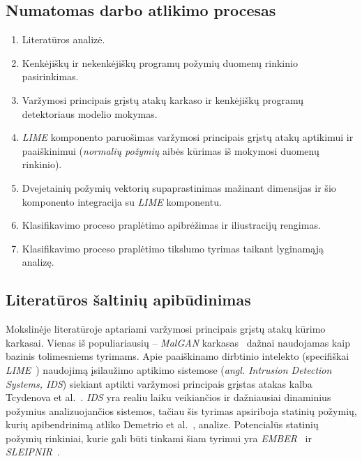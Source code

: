 \subsection{Numatomas darbo atlikimo procesas}

\begin{enumerate}
    \item Literatūros analizė.
    \item Kenkėjiškų ir nekenkėjiškų programų požymių duomenų rinkinio pasirinkimas.
    \item Varžymosi principais grįstų atakų karkaso ir kenkėjiškų programų detektoriaus
          modelio mokymas.
    \item \textit{LIME} komponento paruošimas varžymosi principais grįstų atakų aptikimui ir paaiškinimui (\textit{normalių požymių} aibės kūrimas iš mokymosi duomenų rinkinio).
    \item Dvejetainių požymių vektorių supaprastinimas mažinant dimensijas ir šio
          komponento integracija su \textit{LIME} komponentu.
    \item Klasifikavimo proceso praplėtimo apibrėžimas ir iliustracijų rengimas.
    \item Klasifikavimo proceso praplėtimo tikslumo tyrimas taikant lyginamąją analizę.
\end{enumerate}

\subsection{Literatūros šaltinių apibūdinimas}

Mokslinėje literatūroje aptariami varžymosi principais grįstų atakų kūrimo
karkasai. Vienas iš populiariausių -- \textit{MalGAN}
karkasas~\cite{huGeneratingAdversarialMalware2017} dažnai naudojamas kaip
bazinis tolimesniems tyrimams. Apie paaiškinamo dirbtinio intelekto
(specifiškai \textit{LIME}~\cite{ribeiroWhyShouldTrust2016}) naudojimą įsilaužimo aptikimo sistemose
(\textit{angl. Intrusion Detection Systems, IDS}) siekiant aptikti varžymosi
principais grįstas atakas kalba Tcydenova et
al.~\cite{tcydenovaDetectionAdversarialAttacks2021}. \textit{IDS} yra realiu
laiku veikiančios ir dažniausiai dinaminius požymius analizuojančios sistemos,
tačiau šis tyrimas apsiriboja statinių požymių, kurių apibendrinimą atliko
Demetrio et al.~\cite{demetrioAdversarialEXEmplesSurvey2021}, analize.
Potencialūs statinių požymių rinkiniai, kurie gali būti tinkami šiam tyrimui
yra \textit{EMBER}~\cite{andersonEMBEROpenDataset2018a} ir
\textit{SLEIPNIR}~\cite{al-dujailiAdversarialDeepLearning2018}.